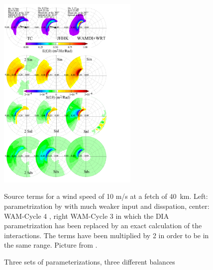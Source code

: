 \begin{figure}[bht]
\centerline{\includegraphics[width=0.6\textwidth]{FIGS_CH_SOURCETERMS/termesource2D.pdf}}
\caption{Three sets of parameterizations, three different balances}{Source terms for a wind speed of 10 m/s at a 
fetch of 40~km. Left: parametrization by \cite{Tolman&Chalikov1996} with much weaker input and disspation,
center:  WAM-Cycle 4 \citep{Janssen&al.1994}, right WAM-Cycle 3 in which the DIA parametrization has been replaced 
by an exact calculation of the interactions. The \cite{Tolman&Chalikov1996} 
terms have been multiplied by 2 in order to be in the same range. Picture from \cite{Ardhuin&al.2007}.}
\label{fig_sourceterms2D}
\end{figure}

